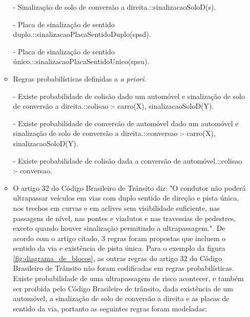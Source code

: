 \documentclass[
	12pt,				%
    oneside,			%
	a4paper,			%
	english,			%
	french,				%
	spanish,			%
	brazil,				%
	]{abntex2}
\begin{document}
\begin{enumerate}
\begin{itemize}
            - Sinalização de solo de conversão a direita.::sinalizacaoSoloD(s).\newline

            - Placa de sinalização de sentido duplo.::sinalizacaoPlacaSentidoDuplo(spsd).\newline
            
            - Placa de sinalização de sentido único.::sinalizacaoPlacaSentidoUnico(spsu).\newline

            \item Regras probabilísticas definidas a \textit{a priori}.\newline


            - Existe probabilidade de colisão dado um automóvel e sinalização de solo de conversão a direita.::colisao :- carro(X), sinalizacaoSoloD(Y).\newline
            
            - Existe probabilidade de conversão de automóvel dado um automóvel e sinalização de solo de conversão a direita.::conversao :- carro(X), sinalizacaoSoloD(Y).\newline
            
            - Existe probabilidade de colisão dada a conversão de automóvel.::colisao :- conversao.\newline

           \item O artigo 32 do Código Brasileiro de Trânsito diz: "O condutor não poderá ultrapassar veículos em vias com duplo sentido de direção e pista única, nos trechos em curvas e em aclives sem visibilidade suficiente, nas passagens de nível, nas pontes e viadutos e nas travessias de pedestres, exceto quando houver sinalização permitindo a ultrapassagem.". De acordo com o artigo citado, 3 regras foram propostas que incluem o sentido da via e existência de pista única. Para o exemplo da figura \ref{fig:diagrama_de_blocos}, as outras regras do artigo 32 do Código Brasileiro de Trânsito não foram codificadas em regras probabilísticas. Existe probabilidade de uma ultrapassagem de risco acontecer, e também ser proibida pelo Código Brasileiro de trânsito, dada existência de um automóvel, a sinalização de solo de conversão a direita e as placas de sentido da via, portanto as seguintes regras foram modeladas:\newline
           

\end{itemize}
\end{enumerate}
\end{document}
